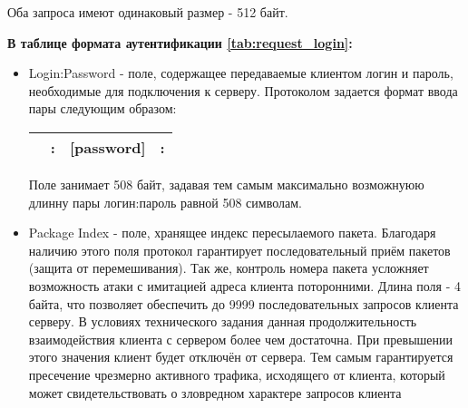 Оба запроса имеют одинаковый размер - 512 байт. 

\textbf{В таблице формата аутентификации \ref{tab:request_login}:}
\begin{itemize}
\item Login:Password - поле, содержащее передаваемые клиентом логин и пароль, необходимые для подключения к серверу. Протоколом задается формат ввода пары следующим образом:
\begin{table}[h]
	\centering
	\begin{tabular}{| l l l l |}
	\hline
	[login] & : & [password] & : \\ 
	\hline
	\end{tabular}
\end{table}

Поле занимает 508 байт, задавая тем самым максимально возможнуюю длинну пары логин:пароль равной 508 символам.

\item Package Index - поле, хранящее индекс пересылаемого пакета. Благодаря наличию этого поля протокол гарантирует последовательный приём пакетов (защита от перемешивания). Так же, контроль номера пакета усложняет возможность атаки с имитацией адреса клиента поторонними. Длина поля - 4 байта, что позволяет обеспечить до 9999 последовательных запросов клиента серверу. В условиях технического задания данная продолжительность взаимодействия клиента с сервером более чем достаточна. При превышении этого значения клиент будет отключён от сервера. Тем самым гарантируется пресечение чрезмерно активного трафика, исходящего от клиента, который может свидетельствовать о зловредном характере запросов клиента
\end{itemize}


